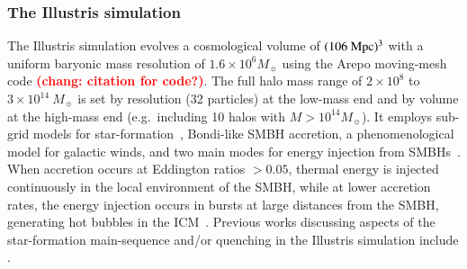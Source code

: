 \documentclass[preprint2,tighten]{aastex62}
\newcommand{\todo}[1]{{\bf \textcolor{red}{ #1}}}
\begin{document}


\subsubsection{The Illustris simulation}
The Illustris simulation \citep{vogelsberger2014,genel2014} evolves a
cosmological volume of $(106\ \rm{Mpc})^3$ with a uniform baryonic mass
resolution of $1.6\times10^6M_{\sun}$ using the Arepo moving-mesh code \todo{(chang: citation for code?)}. 
The full halo mass range of $2 \times 10^8$ to $3\times 10^{14}\ M_{\sun}$ 
is set by resolution (32 particles) at the low-mass end and by volume at 
the high-mass end (e.g.~including 10 halos with $M>10^{14}M_{\sun}$). 
It employs sub-grid models for star-formation~\citep{springel2003},
Bondi-like SMBH accretion, a phenomenological model for galactic winds, and 
two main modes for energy injection from 
SMBHs~\citep[\emph{see}][]{vogelsberger2013}. 
When accretion occurs at Eddington ratios $>0.05$, thermal energy is 
injected continuously in the local environment of the SMBH, while at 
lower accretion rates, the energy injection occurs in bursts at large
distances from the SMBH, generating hot bubbles in the ICM~\citep{sijacki2007}.
Previous works discussing aspects of the star-formation main-sequence and/or
quenching in the Illustris simulation include 
\citet{vogelsberger2014, sparre2015, bluck2016, terrazas2017}.
\end{document}
